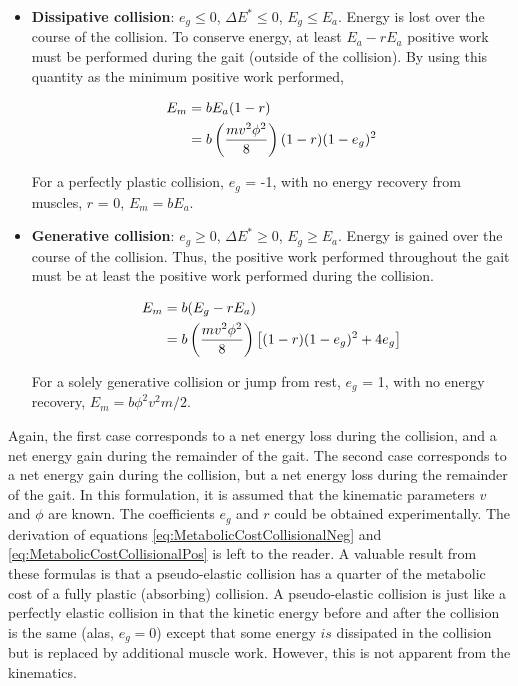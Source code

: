 \begin{itemize}
\item \textbf{Dissipative collision}: $e_{g} \leq 0$, $\Delta E^* \leq 0$, $E_{g} \leq E_{a}$. Energy is lost over the course of the collision. To conserve energy, at least $E_a - rE_a$ positive work must be performed during the gait (outside of the collision). By using this quantity as the minimum positive work performed,

\begin{align}
E_{m}& = bE_{a}(1-r) \notag \\
 &= b\left(\frac{m v^{2} \phi^{2}}{8}\right)(1-r)(1-e_{g})^2
\label{eq:MetabolicCostCollisionalNeg}
\end{align}

For a perfectly plastic collision, $e_g$ = -1, with no energy recovery from muscles, $r$ = 0, $E_{m} = b E_{a}$.

\item \textbf{Generative collision}: $e_{g} \geq 0$, $\Delta E^* \geq 0$, $E_{g} \geq E_{a}$. Energy is gained over the course of the collision. Thus, the positive work performed throughout the gait must be at least the positive work performed during the collision.

\begin{align}
E_{m} &= b(E_{g} - r E_{a}) \notag \\
 &= b\left(\frac{m v^{2} \phi^{2}}{8}\right)\left[(1-r)(1-e_{g})^2 + 4e_{g}\right]
\label{eq:MetabolicCostCollisionalPos}
\end{align}

For a solely generative collision or jump from rest, $e_{g}$ = 1, with no energy recovery, $E_{m} = b \phi^2 v^2 m / 2$.
\end{itemize}

Again, the first case corresponds to a net energy loss during the collision, and a net energy gain during the remainder of the gait. The second case corresponds to a net energy gain during the collision, but a net energy loss during the remainder of the gait. In this formulation, it is assumed that the kinematic parameters $v$ and $\phi$ are known. The coefficients $e_{g}$ and $r$ could be obtained experimentally. The derivation of equations \ref{eq:MetabolicCostCollisionalNeg} and \ref{eq:MetabolicCostCollisionalPos} is left to the reader. A valuable result from these formulas is that a pseudo-elastic  collision has a quarter of the metabolic cost of a fully plastic (absorbing) collision. A pseudo-elastic collision is just like a perfectly elastic collision in that the kinetic energy before and after the collision is the same (alas, $e_{g} = 0$) except that some energy $is$ dissipated in the collision but is replaced by additional muscle work. However, this is not apparent from the kinematics.

